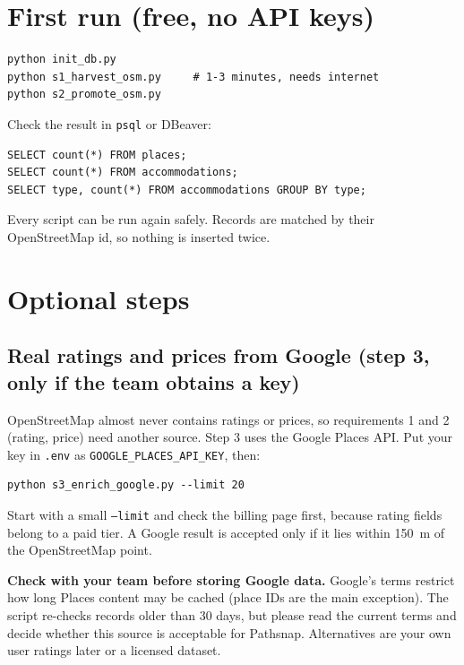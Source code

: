 \documentclass[11pt,a4paper]{article}
\begin{document}
\section{First run (free, no API keys)}
\begin{lstlisting}
python init_db.py
python s1_harvest_osm.py     # 1-3 minutes, needs internet
python s2_promote_osm.py
\end{lstlisting}
Check the result in \texttt{psql} or DBeaver:
\begin{lstlisting}
SELECT count(*) FROM places;
SELECT count(*) FROM accommodations;
SELECT type, count(*) FROM accommodations GROUP BY type;
\end{lstlisting}
Every script can be run again safely. Records are matched by their OpenStreetMap id, so nothing is inserted twice.

\section{Optional steps}
\subsection{Real ratings and prices from Google (step 3, only if the team obtains a key)}
OpenStreetMap almost never contains ratings or prices, so requirements 1 and 2 (rating, price) need another source. Step 3 uses the Google Places API. Put your key in \texttt{.env} as \texttt{GOOGLE\_PLACES\_API\_KEY}, then:
\begin{lstlisting}
python s3_enrich_google.py --limit 20
\end{lstlisting}
Start with a small \texttt{--limit} and check the billing page first, because rating fields belong to a paid tier. A Google result is accepted only if it lies within 150~m of the OpenStreetMap point.

\textbf{Check with your team before storing Google data.} Google's terms restrict how long Places content may be cached (place IDs are the main exception). The script re-checks records older than 30 days, but please read the current terms and decide whether this source is acceptable for Pathsnap. Alternatives are your own user ratings later or a licensed dataset.
\end{document}
